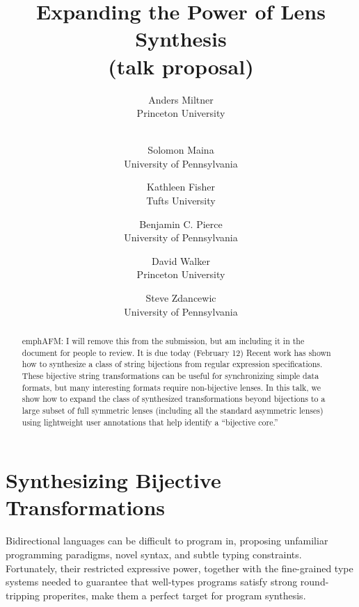 \documentclass[a4paper]{article}
\title{Expanding the Power of Lens Synthesis \\ (talk proposal)}
\author{
Anders Miltner \\ Princeton University \\ \ 
\and
Solomon Maina \\ University of Pennsylvania
\and
Kathleen Fisher \\ Tufts University
\and
Benjamin C. Pierce \\ University of Pennsylvania
\and
David Walker \\ Princeton University
\and
Steve Zdancewic \\ University of Pennsylvania
}
\begin{document}
\maketitle



\begin{abstract}
emph{AFM: I will remove this from the submission, but am including it in the
    document for people to review. It is due today (February 12)}
Recent work has shown how to synthesize a class of string bijections from
regular expression specifications. These bijective string transformations
can be useful for synchronizing simple data formats, but many interesting
formats require non-bijective lenses. In this talk, we show how to expand
the class of synthesized transformations beyond bijections to a large subset
of full symmetric lenses (including all the standard asymmetric lenses)
using lightweight user annotations that help identify a ``bijective core.''
\end{abstract}

\section{Synthesizing Bijective Transformations}

Bidirectional languages can be difficult to program in, proposing unfamiliar
programming paradigms, novel syntax, and subtle typing constraints.
Fortunately, their restricted expressive power, together with the
fine-grained type systems needed to guarantee that well-types programs
satisfy strong round-tripping properites, make them a perfect target for
program synthesis.  
\end{document}
